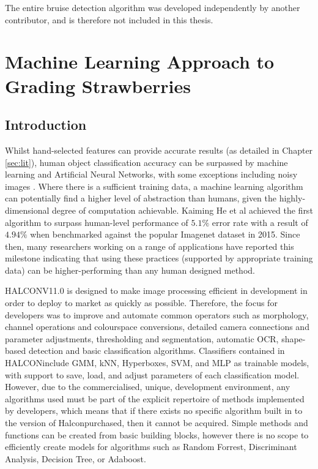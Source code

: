 \documentclass[fleqn,twoside,12pt]{report}
\begin{document}
The entire bruise detection algorithm was developed independently by another contributor, and is therefore not included in this thesis.



\newpage

\chapter{Machine Learning Approach to Grading Strawberries}
\label{sec:IV}

\section{Introduction}


Whilst hand-selected features can provide accurate results (as detailed in Chapter \ref{sec:lit}), human object classification accuracy can be surpassed by machine learning and Artificial Neural Networks, with some exceptions including noisy images \cite{dodge}. Where there is a sufficient training data, a machine learning algorithm can potentially find a higher level of abstraction than humans, given the highly-dimensional degree of computation achievable. Kaiming He et al \cite{he2} achieved the first algorithm to surpass human-level performance of $5.1\%$ error rate with a result of $4.94\%$ when benchmarked against the popular Imagenet dataset in 2015. Since then, many researchers working on a range of applications have reported this milestone \cite{geirhos, saon, xiong, han} indicating that using these practices (supported by appropriate training data) can be higher-performing than any human designed method. 

HALCON\texttrademark V11.0 is designed to make image processing efficient in development in order to deploy to market as quickly as possible. Therefore, the focus for developers was to improve and automate common operators such as morphology, channel operations and colourspace conversions, detailed camera connections and parameter adjustments, thresholding and segmentation, automatic OCR, shape-based detection and basic classification algorithms. Classifiers contained in HALCON\texttrademark include GMM, kNN, Hyperboxes, SVM, and MLP as trainable models, with support to save, load, and adjust parameters of each classification model. However, due to the commercialised, unique, development environment, any algorithms used must be part of the explicit repertoire of methods implemented by developers, which means that if there exists no specific algorithm built in to the version of Halcon\texttrademark purchased, then it cannot be acquired. Simple methods and functions can be created from basic building blocks, however there is no scope to efficiently create models for algorithms such as Random Forrest, Discriminant Analysis, Decision Tree, or Adaboost. 
\end{document}
